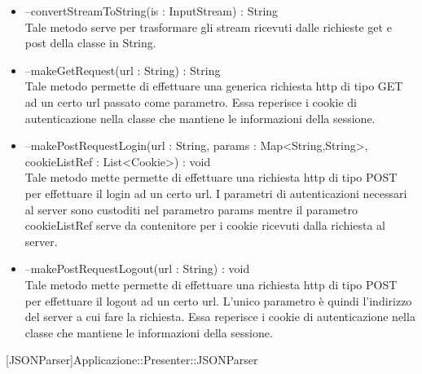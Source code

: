 \begin{itemize}
\begin{itemize}
					\item[\ding{111}] {{--convertStreamToString(is : InputStream) : String}} \\ [1mm] Tale metodo serve per trasformare gli stream ricevuti dalle richieste get e post della classe in String.
					\item[\ding{111}] {{--makeGetRequest(url : String) : String}} \\ [1mm] Tale metodo permette di effettuare una generica richiesta http di tipo GET ad un certo url passato come parametro. Essa reperisce i cookie di autenticazione nella classe che mantiene le informazioni della sessione.
					\item[\ding{111}] {{--makePostRequestLogin(url : String, params : Map<String,String>, cookieListRef : List<Cookie>) : void}} \\ [1mm] Tale metodo mette permette di effettuare una richiesta http di tipo POST per effettuare il login ad un certo url. I parametri di autenticazioni necessari al server sono custoditi nel parametro params mentre il parametro cookieListRef serve da contenitore per i cookie ricevuti dalla richiesta al server.
					\item[\ding{111}] {{--makePostRequestLogout(url : String) : void}} \\ [1mm] Tale metodo mette permette di effettuare una richiesta http di tipo POST per effettuare il logout ad un certo url. L'unico parametro è quindi l'indirizzo del server a cui fare la richiesta. Essa reperisce i cookie di autenticazione nella classe che mantiene le informazioni della sessione.
				\end{itemize}
		
			\end{itemize}

			
			[JSONParser]{Applicazione::Presenter::JSONParser}
			

	
